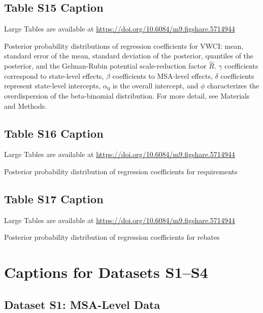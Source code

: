 \documentclass[draft]{agujournal}\usepackage{knitr}
\begin{document}
\subsection*{Table S15 Caption}
\begin{table}[H]
\centering
Large Tables are available at \url{https://doi.org/10.6084/m9.figshare.5714944}
\caption{Posterior probability distributions of regression coefficients for VWCI: mean, standard error of the mean, standard deviation of the posterior, quantiles of the posterior, and the Gelman-Rubin potential scale-reduction factor $\hat R$. $\gamma$ coefficients correspond to state-level effects, $\beta$ coefficients to MSA-level effects, $\delta$ coefficients represent state-level intercepts, $\alpha_0$ is the overall intercept, and $\phi$ characterizes the overdispersion of the beta-binomial distribution. For more detail, see Materials and Methods.}
\label{tab:vwci_posterior}
\end{table}


\subsection*{Table S16 Caption}
\begin{table}[H]
\centering
Large Tables are available at \url{https://doi.org/10.6084/m9.figshare.5714944}
\caption{Posterior probability distribution of regression coefficients for requirements}
\label{tab:req_posterior}
\end{table}


\subsection*{Table S17 Caption}
\begin{table}[H]
\centering
Large Tables are available at \url{https://doi.org/10.6084/m9.figshare.5714944}
\caption{Posterior probability distribution of regression coefficients for rebates}
\label{tab:reb_posterior}
\end{table}



\section*{Captions for Datasets S1--S4}

\subsection*{Dataset S1: MSA-Level Data}
\end{document}
